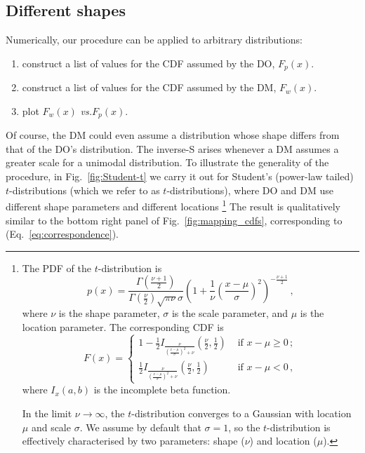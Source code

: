 \documentclass[a4paper, 12pt]{article}
\newcommand{\eref}[1]{(Eq.~\ref{eq:#1})}
\newcommand{\fref}[1]{Fig.~\ref{fig:#1}}
\newcommand{\seclabel}[1]{\label{sec:#1}}
\newcommand{\vs}{\textit{vs.}\xspace}
\newcommand{\be}{\begin{equation}}
\newcommand{\ee}{\end{equation}}
\begin{document}
\subsection{Different shapes\seclabel{Different_shapes}}
Numerically, our procedure can be applied to arbitrary distributions:
\begin{enumerate}
\item
construct a list of values for the CDF assumed by the DO, $F_p(x)$.
\item
construct a list of values for the CDF assumed by the DM, $F_w(x)$.
\item
plot $F_w(x)$ \vs $F_p(x)$.
\end{enumerate}
Of course, the DM could even assume a distribution whose shape differs from that of the DO's distribution.
The inverse-S arises whenever a DM assumes a greater scale for a unimodal distribution.
To illustrate the generality of the procedure, in \fref{Student-t} we carry it out for Student's (power-law tailed) $t$-distributions (which we refer to as $t$-distributions), where DO and DM use different shape parameters and different locations
\footnote{
The PDF of the $t$-distribution is
%
\be
p\left(x\right) = \frac{\Gamma\left(\frac{\nu+1}{2}\right)} {\Gamma\left(\frac{\nu}{2}\right)\sqrt{\pi\nu}\sigma} \left(1+\frac{1}{\nu}\left(\frac{x-\mu}{\sigma}\right)^2 \right)^{-\frac{\nu+1}{2}}\,,
\ee
%
where $\nu$ is the shape parameter, $\sigma$ is the scale parameter, and $\mu$ is the location parameter. The corresponding CDF is
%
\be
F\left(x\right) =
\begin{cases}
1 - \frac{1}{2} I_{\frac{\nu}{\left(\frac{x-\mu}{\sigma}\right)^2 + \nu}}\left(\frac{\nu}{2},\frac{1}{2}\right) &\text{ if } x-\mu \geq 0\,;\\
\frac{1}{2} I_{\frac{\nu}{\left(\frac{x-\mu}{\sigma}\right)^2 + \nu}}\left(\frac{\nu}{2},\frac{1}{2}\right) &\text{ if } x-\mu < 0\,,
\end{cases}
\ee
%
where $I_x\left(a,b\right)$ is the incomplete beta function.

In the limit $\nu \rightarrow \infty$, the $t$-distribution converges to a Gaussian with location $\mu$ and scale $\sigma$. We assume by default that $\sigma = 1$, so the $t$-distribution is effectively characterised by two parameters: shape ($\nu$) and location ($\mu$).
}
The result is qualitatively similar to the bottom right panel of \fref{mapping_cdfs}, corresponding to \eref{correspondence}.
\end{document}
